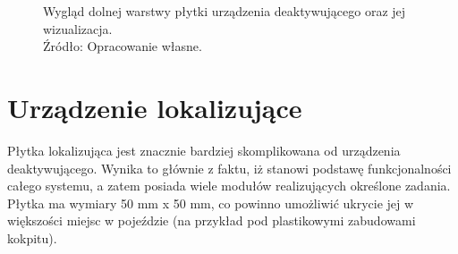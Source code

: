 \begin{figure}[H]
\centering
	\qquad
	
	\caption{Wygląd dolnej warstwy płytki urządzenia deaktywującego oraz jej wizualizacja. \\ Źródło: Opracowanie własne.}
	\label{fig:image_key_tag_bottom_board}
\end{figure}

\section{Urządzenie lokalizujące}

Płytka lokalizująca jest znacznie bardziej skomplikowana od urządzenia deaktywującego. Wynika to głównie z faktu, iż stanowi podstawę funkcjonalności całego systemu, a zatem posiada wiele modułów realizujących określone zadania. Płytka ma wymiary 50 mm x 50 mm, co powinno umożliwić ukrycie jej w większości miejsc w pojeździe (na przykład pod plastikowymi zabudowami kokpitu). 

